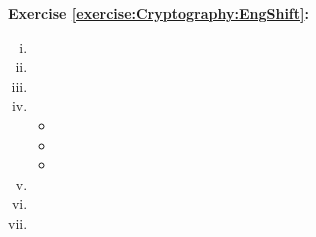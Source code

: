 \noindent\textbf{Exercise \ref{exercise:Cryptography:EngShift}:}
\begin{enumerate}[(i)]
\item
\item
\item
\item
\begin{itemize}
\item
\item
\item
\end{itemize}
\item
\item
\item
\end{enumerate}

